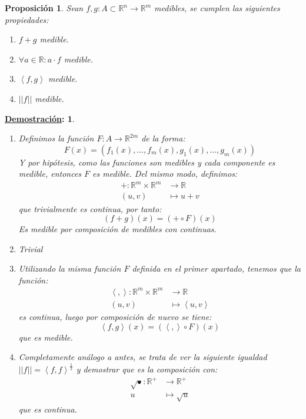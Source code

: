 \documentclass[10pt,a4paper,openright]{book}
\theoremstyle{break}
\newtheorem*{prop}{Proposición}
\newtheorem*{demo}{\underline{Demostración}:}
\begin{document}
\begin{prop}
Sean $f, g: A\subset \mathbb{R}^n \rightarrow \mathbb{R}^m$ medibles, se cumplen las siguientes propiedades:
\begin{enumerate}
\item $f+g$ medible.
\item $\forall a \in \mathbb{R}: a\cdot f$ medible.
\item $\left<f, g\right>$ medible.
\item $\vert \vert f \vert \vert$ medible.
\end{enumerate}
\end{prop}
\begin{demo}
\begin{enumerate}
\item Definimos la función $F: A \to \mathbb{R}^{2m}$ de la forma:
$$F\left( x \right) = \left( f_1\left( x \right), \ldots, f_m\left( x \right), g_1\left( x \right), \ldots, g_m\left( x \right) \right)$$
Y por hipótesis, como las funciones son medibles y cada componente es medible, entonces $F$ es medible. Del mismo modo, definimos: 
\begin{align*}
+: \mathbb{R}^m \times \mathbb{R}^m & \rightarrow \mathbb{R} \\
\left( u, v \right) &\mapsto u+v
\end{align*}
que trivialmente es continua, por tanto:
$$\left( f + g \right)\left( x \right) = \left( + \circ F \right)\left( x \right)$$
Es medible por composición de medibles con continuas.

\item Trivial

\item Utilizando la misma función $F$ definida en el primer apartado, tenemos que la función:
\begin{align*}
\left<,\right>: \mathbb{R}^m \times \mathbb{R}^m & \rightarrow \mathbb{R} \\
\left( u, v \right) &\mapsto \left<u, v\right>
\end{align*}
es continua, luego por composición de nuevo se tiene:
$$\left<f, g\right> \left( x \right) = \left( \left<, \right> \circ F \right)\left( x \right)$$
que es medible.

\item Completamente análogo a antes, se trata de ver la siguiente igualdad $\vert \vert f \vert \vert = \left<f, f\right>^{\frac{1}{2}}$ y demostrar que es la composición con:
\begin{align*}
\sqrt{•}: \mathbb{R}^+ &\rightarrow \mathbb{R}^+ \\
u &\mapsto \sqrt{u}
\end{align*}
que es continua.
\end{enumerate}
\end{demo}
\end{document}

